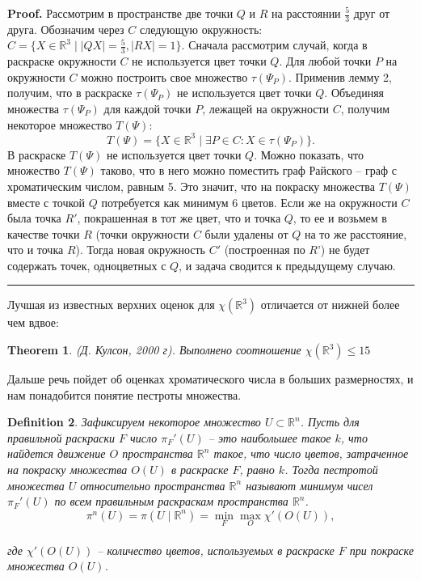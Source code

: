 \documentclass{report}%
\newtheorem{theorem}{Theorem}
\newtheorem{definition}[theorem]{Definition}
\newenvironment{proof}[1][Proof]{\textbf{#1.} }{\ \rule{0.5em}{0.5em}}
\begin{document}
\begin{proof}
		Рассмотрим в пространстве две точки $Q$ и $R$ на расстоянии $\frac{5}{3}$ друг от друга.
		Обозначим через $C$ следующую окружность: $ C = \{X \in  \mathbb{R}^3 \mid |QX|= \frac{5}{3},|RX| = 1 \}$.
		Сначала рассмотрим случай, когда в раскраске окружности $C$ не используется цвет точки $Q$. 
		Для любой точки $P$ на окружности $C$ можно построить свое множество $\tau(\Psi_P)$.
		Применив лемму 2, получим, что в раскраске $\tau(\Psi_P)$ не используется цвет точки $Q$.
		Объединяя множества $\tau(\Psi_P)$ для каждой точки $P$, лежащей на 	окружности $C$, получим некоторое множество $T(\Psi)$: 
		\begin{equation}
				T(\Psi) = \{X \in \mathbb{R}^3 \mid \exists P \in C \colon X \in \tau(\Psi_P) \}.
		\end{equation}
		В раскраске $T(\Psi)$ не используется цвет точки $Q$. Можно показать, что множество $T(\Psi)$ таково,
		что в него можно поместить граф Райского – граф с хроматическим числом, равным 5.
		Это значит, что на покраску множества $T(\Psi)$ вместе с точкой $Q$ потребуется как минимум 6 цветов.
		Если же на окружности $C$ была точка $R'$, покрашенная в тот же цвет, что и точка $Q$,
		то ее и возьмем в качестве точки $R$ (точки окружности $C$ были удалены от $Q$ на то же расстояние, что и точка $R$).
		Тогда новая окружность $C'$ (построенная по $R’$) не будет содержать точек, одноцветных с $Q$, и задача сводится к предыдущему случаю.
\end{proof}

Лучшая из известных верхних оценок для $\chi(\mathbb{R}^3)$ отличается от нижней более чем вдвое:

\begin{theorem} (Д. Кулсон, 2000 г).
		Выполнено соотношение $\chi(\mathbb{R}^3) \leq 15$
\end{theorem}

Дальше речь пойдет об оценках хроматического числа в больших размерностях, и нам понадобится понятие пестроты множества.

\begin{definition}
		Зафиксируем некоторое множество $U \subset \mathbb{R}^n$. Пусть для правильной раскраски $F$
		число $\pi_F'(U)$ – это наибольшее такое $k$, что найдется движение $O$ пространства $\mathbb{R}^n$ такое,
		что число цветов, затраченное на покраску множества $O(U)$ в раскраске $F$, равно $k$.
		Тогда пестротой множества $U$ относительно пространства $\mathbb{R}^n$ называют
		минимум чисел $\pi_F'(U)$ по всем правильным раскраскам пространства $\mathbb{R}^n$.
		\begin{equation}
				\pi^n(U) = \pi(U \mid \mathbb{R}^n) = \min_F\max_O\chi'(O(U)),
		\end{equation} \\
		где $\chi'(O(U))$ – количество цветов, используемых в раскраске $F$ при покраске множества $O(U)$.
\end{definition}
\end{document}
